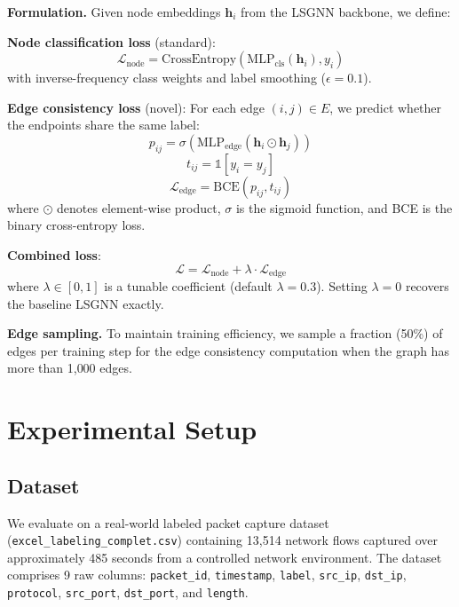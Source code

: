\documentclass[conference]{IEEEtran}
\begin{document}
\textbf{Formulation.} Given node embeddings $\mathbf{h}_i$ from the LSGNN backbone, we define:

\textbf{Node classification loss} (standard):
\begin{equation}
    \mathcal{L}_{\text{node}} = \text{CrossEntropy}\!\left(\text{MLP}_{\text{cls}}(\mathbf{h}_i), y_i\right)
\end{equation}
with inverse-frequency class weights and label smoothing ($\epsilon = 0.1$).

\textbf{Edge consistency loss} (novel): For each edge $(i, j) \in E$, we predict whether the endpoints share the same label:
\begin{equation}
    p_{ij} = \sigma\!\left(\text{MLP}_{\text{edge}}(\mathbf{h}_i \odot \mathbf{h}_j)\right)
\end{equation}
\begin{equation}
    t_{ij} = \mathbb{1}[y_i = y_j]
\end{equation}
\begin{equation}
    \mathcal{L}_{\text{edge}} = \text{BCE}(p_{ij}, t_{ij})
\end{equation}
where $\odot$ denotes element-wise product, $\sigma$ is the sigmoid function, and BCE is the binary cross-entropy loss.

\textbf{Combined loss}:
\begin{equation}
    \mathcal{L} = \mathcal{L}_{\text{node}} + \lambda \cdot \mathcal{L}_{\text{edge}}
\end{equation}
where $\lambda \in [0, 1]$ is a tunable coefficient (default $\lambda = 0.3$). Setting $\lambda = 0$ recovers the baseline LSGNN exactly.

\textbf{Edge sampling.} To maintain training efficiency, we sample a fraction (50\%) of edges per training step for the edge consistency computation when the graph has more than 1{,}000 edges.

\section{Experimental Setup}

\subsection{Dataset}

We evaluate on a real-world labeled packet capture dataset (\texttt{excel\_labeling\_complet.csv}) containing 13{,}514 network flows captured over approximately 485 seconds from a controlled network environment. The dataset comprises 9 raw columns: \texttt{packet\_id}, \texttt{timestamp}, \texttt{label}, \texttt{src\_ip}, \texttt{dst\_ip}, \texttt{protocol}, \texttt{src\_port}, \texttt{dst\_port}, and \texttt{length}.
\end{document}
